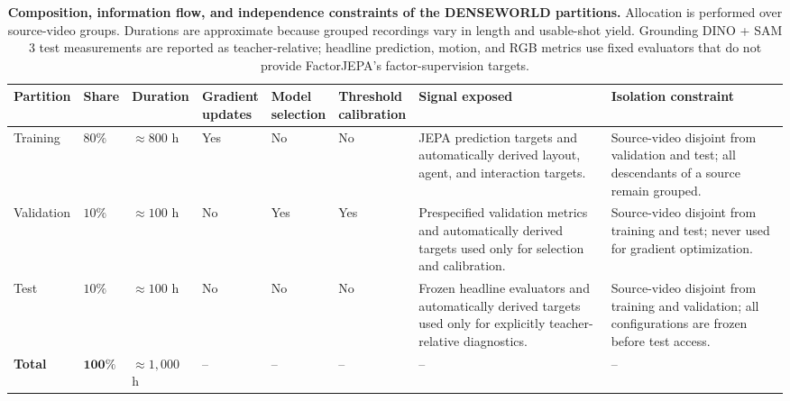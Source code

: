 \begin{table}[t]
\centering
\caption{
\textbf{Composition, information flow, and independence constraints of
the DENSEWORLD partitions.}
Allocation is performed over source-video groups. Durations are
approximate because grouped recordings vary in length and usable-shot
yield. Grounding DINO + SAM 3 test measurements are reported as teacher-relative;
headline prediction, motion, and RGB metrics use fixed evaluators that
do not provide FactorJEPA's factor-supervision targets.
}
\label{tab:dataset_partitions}
\scriptsize
\setlength{\tabcolsep}{3pt}
\renewcommand{\arraystretch}{1.14}
\begin{tabular}{
    p{}
    p{}
    p{}
    p{}
    p{}
    p{}
    p{}
    p{}
}
\toprule
\textbf{Partition}
&
\textbf{Share}
&
\textbf{Duration}
&
\shortstack{\textbf{Gradient}\\\textbf{updates}}
&
\shortstack{\textbf{Model}\\\textbf{selection}}
&
\shortstack{\textbf{Threshold}\\\textbf{calibration}}
&
\textbf{Signal exposed}
&
\textbf{Isolation constraint}
\\
\midrule

Training
&
\(80\%\)
&
\(\approx800\) h
&
Yes
&
No
&
No
&
JEPA prediction targets and automatically derived layout, agent, and
interaction targets.
&
Source-video disjoint from validation and test; all descendants of a
source remain grouped.
\\

Validation
&
\(10\%\)
&
\(\approx100\) h
&
No
&
Yes
&
Yes
&
Prespecified validation metrics and automatically derived targets used only
for selection and calibration.
&
Source-video disjoint from training and test; never used for gradient
optimization.
\\

Test
&
\(10\%\)
&
\(\approx100\) h
&
No
&
No
&
No
&
Frozen headline evaluators and automatically derived targets used only for
explicitly teacher-relative diagnostics.
&
Source-video disjoint from training and validation; all configurations
are frozen before test access.
\\

\midrule

\textbf{Total}
&
\(\mathbf{100\%}\)
&
\(\approx1{,}000\) h
&
-- & -- & -- & -- & --
\\

\bottomrule
\end{tabular}
\end{table}

